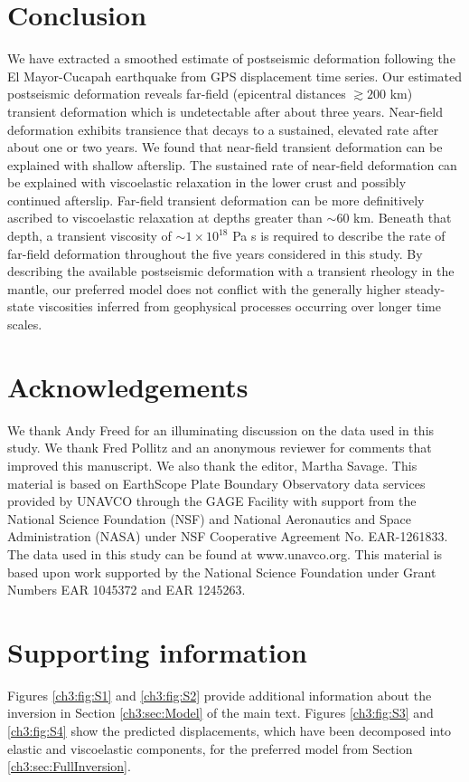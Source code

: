 \section{Conclusion}
We have extracted a smoothed estimate of postseismic deformation
following the El Mayor-Cucapah earthquake from GPS displacement time
series.  Our estimated postseismic deformation reveals far-field
(epicentral distances ${\gtrsim}200$ km) transient deformation which
is undetectable after about three years. Near-field deformation
exhibits transience that decays to a sustained, elevated rate after
about one or two years.  We found that near-field transient
deformation can be explained with shallow afterslip.  The sustained
rate of near-field deformation can be explained with viscoelastic
relaxation in the lower crust and possibly continued afterslip.
Far-field transient deformation can be more definitively ascribed to
viscoelastic relaxation at depths greater than ${\sim}60$ km. Beneath
that depth, a transient viscosity of ${\sim}1\times10^{18}$ Pa s is
required to describe the rate of far-field deformation throughout the
five years considered in this study.  By describing the available
postseismic deformation with a transient rheology in the mantle, our
preferred model does not conflict with the generally higher
steady-state viscosities inferred from geophysical processes occurring
over longer time scales.

\section{Acknowledgements}
We thank Andy Freed for an illuminating discussion on the data used in
this study.  We thank Fred Pollitz and an anonymous reviewer for
comments that improved this manuscript. We also thank the editor,
Martha Savage.  This material is based on EarthScope Plate Boundary
Observatory data services provided by UNAVCO through the GAGE Facility
with support from the National Science Foundation (NSF) and National
Aeronautics and Space Administration (NASA) under NSF Cooperative
Agreement No. EAR-1261833.  The data used in this study can be found
at www.unavco.org. This material is based upon work supported by the
National Science Foundation under Grant Numbers EAR 1045372 and EAR
1245263.




\section{Supporting information}
Figures \ref{ch3:fig:S1} and \ref{ch3:fig:S2} provide additional
information about the inversion in Section \ref{ch3:sec:Model} of the
main text. Figures \ref{ch3:fig:S3} and \ref{ch3:fig:S4} show the
predicted displacements, which have been decomposed into elastic and
viscoelastic components, for the preferred model from Section
\ref{ch3:sec:FullInversion}.

